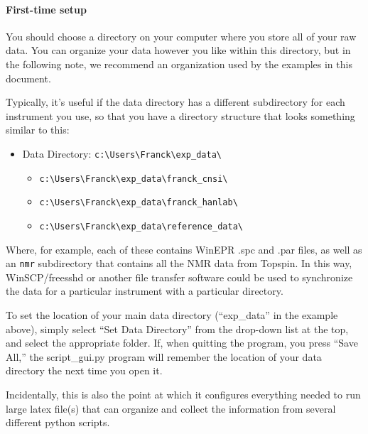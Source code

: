 \paragraph{First-time setup}
You should choose a directory
    on your computer
    where you store all of your raw data. 
You can organize your data however you like within this directory,
    but in the following note,
    we recommend an organization
    used by the examples in this document.
\begin{inplacenotebox}
    Typically, it's useful if the data directory
        has a different subdirectory for
        each instrument you use,
        so that you have a directory structure that
        looks something similar to this:
    \begin{itemize}
        \item Data Directory: \verb|c:\Users\Franck\exp_data\|
            \begin{itemize}
                \item \verb|c:\Users\Franck\exp_data\franck_cnsi\|
                \item \verb|c:\Users\Franck\exp_data\franck_hanlab\|
                \item \verb|c:\Users\Franck\exp_data\reference_data\|
            \end{itemize}
    \end{itemize}
    Where, for example, each of these contains WinEPR .spc and .par files,
        as well as an \verb|nmr| subdirectory that contains all
        the NMR data from Topspin.
    In this way, WinSCP/freesshd or another
        file transfer software could be used to synchronize the
        data for a particular instrument with a particular
        directory.
\end{inplacenotebox}
To set the location of your main data directory
    (``exp\_data'' in the example above),
    simply select ``Set Data Directory'' from the drop-down list
    at the top,
    and select the appropriate folder.
If, when quitting the program, you press ``Save All,''
    the script\_gui.py program
    will remember the location of your data directory
    the next time you open it.
    \begin{inplacenotebox}
        Incidentally, this is also the point at which it configures
            everything needed to run large latex file(s)
            that can organize and collect the information from
            several different python scripts.
    \end{inplacenotebox}
